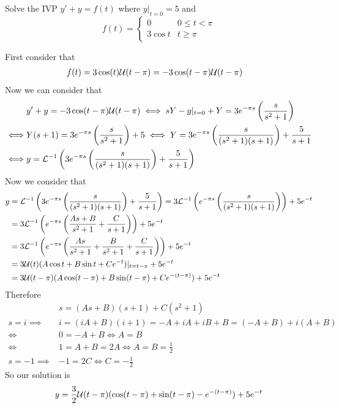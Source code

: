 \documentclass[notes]{subfiles}
\begin{document}
\begin{exercise}
    Solve the IVP $y' + y = f(t)$ where $y|_{t = 0} = 5$ and
    \[
        f(t) = \begin{cases}
            0 & 0 \leq t < \pi \\
            3\cos t & t \geq \pi
        \end{cases}
    \]
\end{exercise}
\begin{solution}
    First consider that
    \begin{align*}
        f(t)
        &= 3\cos(t)\mathcal{U}(t - \pi)
        = -3\cos(t - \pi)\mathcal{U}(t - \pi)
    \end{align*}
    Now we can consider that
    \begin{align*}
        &y' + y = -3\cos(t - \pi)\mathcal{U}(t - \pi)
        \iff sY - y|_{t = 0} + Y = 3e^{-\pi s}\left(\frac{s}{s^2 + 1}\right) \\
        \iff& Y(s + 1) = 3e^{-\pi s}\left(\frac{s}{s^2 + 1}\right) + 5
        \iff Y = 3e^{-\pi s}\left(\frac{s}{(s^2 + 1)(s + 1)}\right) + \frac{5}{s + 1} \\
        \iff& y = \mathcal{L}^{-1} \left( 3e^{-\pi s}\left(\frac{s}{(s^2 + 1)(s + 1)}\right) + \frac{5}{s + 1} \right)
    \end{align*}
    Now we consider that
    \begin{align*}
        y
        &= \mathcal{L}^{-1} \left( 3e^{-\pi s}\left(\frac{s}{(s^2 + 1)(s + 1)}\right) + \frac{5}{s + 1} \right)
        = 3 \mathcal{L}^{-1} \left(e^{-\pi s}\left(\frac{s}{(s^2 + 1)(s + 1)}\right)\right) + 5e^{-t} \\
        &= 3 \mathcal{L}^{-1} \left(e^{-\pi s}\left(\frac{As + B}{s^2 + 1} + \frac{C}{s + 1}\right)\right) + 5e^{-t} \\
        &= 3 \mathcal{L}^{-1} \left(e^{-\pi s}\left(\frac{As}{s^2 + 1} + \frac{B}{s^2 + 1} + \frac{C}{s + 1}\right)\right) + 5e^{-t} \\
        &= 3\mathcal{U}(t)(A\cos t + B\sin t + Ce^{-t})|_{t = t - \pi} + 5e^{-t} \\
        &= 3\mathcal{U}(t - \pi)(A\cos(t - \pi) + B\sin(t - \pi) + Ce^{-(t - \pi)}) + 5e^{-t}
    \end{align*}
    Therefore
    \begin{align*}
        &s = (As + B)(s + 1) + C(s^2 + 1) \\
        s = i \implies& i = (iA + B)(i + 1) = -A + iA + iB + B = (-A + B) + i(A + B) \\
        \iff& 0 = -A + B \iff A = B \\
        \iff& 1 = A + B = 2A \iff A = B = \frac{1}{2} \\
        s = -1 \implies& -1 = 2C \iff C = -\frac{1}{2}
    \end{align*}
    So our solution is
    \[
        y = \frac{3}{2}\mathcal{U}(t - \pi)(\cos(t - \pi) + \sin(t - \pi) - e^{-(t - \pi)}) + 5e^{-t}
    \]
\end{solution}
\end{document}
